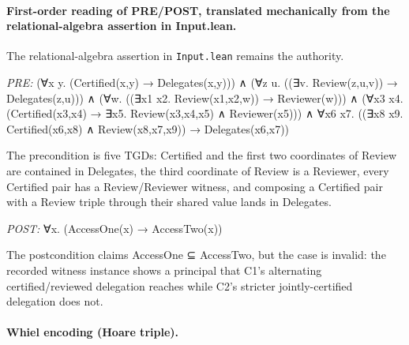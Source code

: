 \documentclass[10pt]{article}
\begin{document}
\paragraph{First-order reading of PRE/POST, translated mechanically from the relational-algebra assertion in Input.lean.} The relational-algebra assertion in \texttt{Input.lean} remains the authority.

\textit{PRE:} (∀x y. (Certified(x,y) → Delegates(x,y))) ∧ (∀z u. ((∃v. Review(z,u,v)) → Delegates(z,u))) ∧ (∀w. ((∃x1 x2. Review(x1,x2,w)) → Reviewer(w))) ∧ (∀x3 x4. (Certified(x3,x4) → ∃x5. Review(x3,x4,x5) ∧ Reviewer(x5))) ∧ ∀x6 x7. ((∃x8 x9. Certified(x6,x8) ∧ Review(x8,x7,x9)) → Delegates(x6,x7))\par The precondition is five TGDs: Certified and the first two coordinates of Review are contained in Delegates, the third coordinate of Review is a Reviewer, every Certified pair has a Review/Reviewer witness, and composing a Certified pair with a Review triple through their shared value lands in Delegates.

\textit{POST:} ∀x. (AccessOne(x) → AccessTwo(x))\par The postcondition claims AccessOne ⊆ AccessTwo, but the case is invalid: the recorded witness instance shows a principal that C1's alternating certified/reviewed delegation reaches while C2's stricter jointly-certified delegation does not.

\paragraph{Whiel encoding (Hoare triple).}
\end{document}
